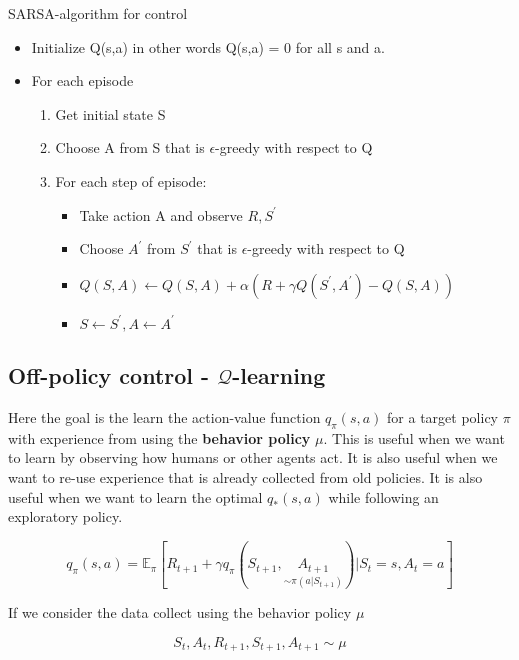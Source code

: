 \begin{wbox}{SARSA-algorithm for control}
\begin{itemize}
	\item Initialize Q(s,a) in other words Q(s,a) = 0 for all s and a.
	\item For each episode
		\begin{enumerate}
			\item Get initial state S
			\item Choose A from S that is $\epsilon$-greedy with respect to Q
			\item For each step of episode:
			\begin{itemize}
				\item Take action A and observe $R,S^{\prime}$
				\item Choose $A^{\prime}$ from $S^{\prime}$ that is $\epsilon$-greedy with respect to Q
				\item $Q(S,A) \leftarrow Q(S,A) + \alpha (R + \gamma Q(S^{\prime}, A^{\prime}) - Q(S,A)) $
				\item $S \leftarrow S^{\prime}, A \leftarrow A^{\prime} $
			\end{itemize}
		\end{enumerate}
\end{itemize}
\end{wbox}

\subsection{Off-policy control - $\mathcal{Q}$-learning}
Here the goal is the learn the action-value function $q_\pi(s,a)$ for a target policy $\pi$ with experience from using the \textbf{behavior policy} $\mu$. This is useful when we want to learn by observing how humans or other agents act. It is also useful when we want to re-use experience that is already collected from old policies. It is also useful when we want to learn the optimal $q_*(s,a)$ while following an exploratory policy.

	\begin{equation}
	 	q_\pi(s,a) = \mathbb{E}_\pi \left[ R_{t+1} + \gamma q_\pi(S_{t+1}, \underset{\sim \pi (a|S_{t+1})}{A_{t+1}}) | S_t=s, A_t = a \right]
	 \end{equation} 

If we consider the data collect using the behavior policy $\mu$ 

	\begin{equation}
		S_t,A_t,R_{t+1},S_{t+1},A_{t+1} \sim \mu
	\end{equation}

